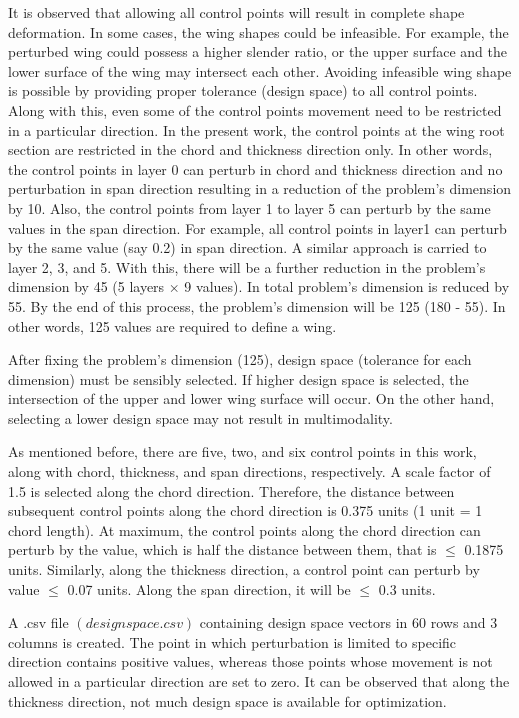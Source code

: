 It is observed that allowing all control points will result in complete shape deformation. In some cases, the wing shapes could be infeasible. For example, the perturbed wing could possess a higher slender ratio, or the upper surface and the lower surface of the wing may intersect each other. Avoiding infeasible wing shape is possible by providing proper tolerance (design space) to all control points. Along with this, even some of the control points movement need to be restricted in a particular direction. In the present work, the control points at the wing root section are restricted in the chord and thickness direction only. In other words, the control points in layer 0 can perturb in chord and thickness direction and no perturbation in span direction resulting in a reduction of the problem's dimension by 10. Also, the control points from layer 1 to layer 5 can perturb by the same values in the span direction. For example, all control points in layer1 can perturb by the same value (say 0.2) in span direction. A similar approach is carried to layer 2, 3,  and 5. With this, there will be a further reduction in the problem's dimension by 45 (5 layers $\times$ 9 values). In total problem's dimension is reduced by 55. By the end of this process, the problem's dimension will be 125 (180 - 55). In other words, 125 values are required to define a wing. 

After fixing the problem's dimension (125), design space (tolerance for each dimension) must be sensibly selected. If higher design space is selected, the intersection of the upper and lower wing surface will occur. On the other hand, selecting a lower design space may not result in multimodality. 

As mentioned before, there are five, two, and six control points in this work, along with chord, thickness, and span directions, respectively. A scale factor of 1.5 is selected along the chord direction. Therefore, the distance between subsequent control points along the chord direction is 0.375 units (1 unit = 1 chord length). At maximum, the control points along the chord direction can perturb by the value, which is half the distance between them, that is $\leq$ 0.1875 units. Similarly, along the thickness direction, a control point can perturb by value $\leq$ 0.07 units. Along the span direction, it will be $\leq$ 0.3 units. 

A .csv file $(design space.csv)$ containing design space vectors in 60 rows and 3 columns is created. The point in which perturbation is limited to specific direction contains positive values, whereas those points whose movement is not allowed in a particular direction are set to zero. It can be observed that along the thickness direction, not much design space is available for optimization.

